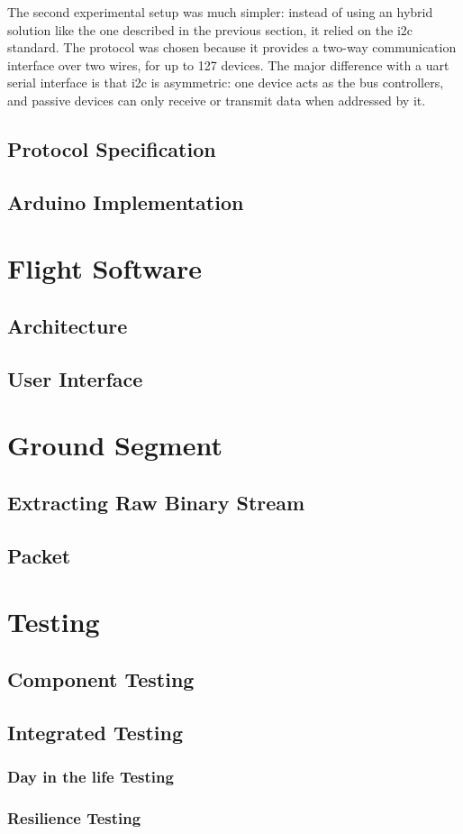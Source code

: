 The second experimental setup was much simpler: instead of using an hybrid
solution like the one described in the previous section, it relied on the
\acrshort{i2c} standard. The protocol was chosen because it provides a two-way
communication interface over two wires, for up to 127 devices. The major
difference with a \acrshort{uart} serial interface is that \acrshort{i2c} is
asymmetric: one device acts as the bus controllers, and passive devices can
only receive or transmit data when addressed by it.

\subsection{Protocol Specification}





\subsection{Arduino Implementation}

\section{Flight Software}
\label{sec:flight-software}

\subsection{Architecture}

\subsection{User Interface}

\section{Ground Segment}
\label{sec:ground-segment}

\subsection{Extracting Raw Binary Stream}

\subsection{Packet}

\section{Testing}
\label{sec:testing}

\subsection{Component Testing}

\subsection{Integrated Testing}

\subsubsection{Day in the life Testing}

\subsubsection{Resilience Testing}